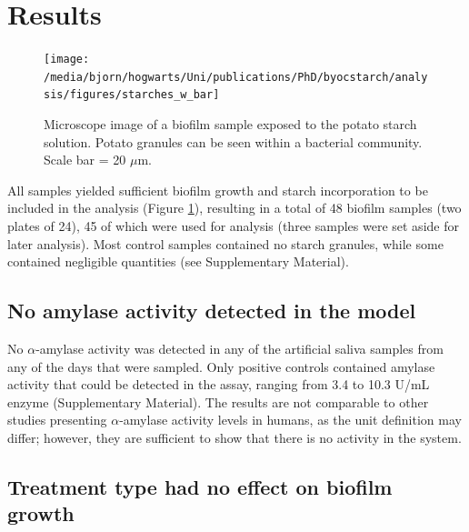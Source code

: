 \documentclass[
]{article}
\begin{document}
\hypertarget{results}{%
\section{Results}\label{results}}

\begin{figure}

{\centering \texttt{[image: /media/bjorn/hogwarts/Uni/publications/PhD/byocstarch/analysis/figures/starches\_w\_bar]} 

}

\caption{Microscope image of a biofilm sample exposed to the potato starch solution. Potato granules can be seen within a bacterial community. Scale bar = 20 $\mu$m.}\label{fig:microscope-fig}
\end{figure}

All samples yielded sufficient biofilm growth and starch incorporation to be
included in the analysis (Figure \ref{fig:microscope-fig}), resulting in a total of 48 biofilm samples (two plates of 24),
45 of which were used for analysis (three samples were set aside for later
analysis).
Most control samples contained no starch granules, while some contained negligible
quantities (see Supplementary Material).

\hypertarget{no-amylase-activity-detected-in-the-model}{%
\subsection{No amylase activity detected in the model}\label{no-amylase-activity-detected-in-the-model}}

No \(\alpha\)-amylase activity was detected in any of the artificial
saliva samples from any of the days that were sampled. Only positive controls
contained amylase activity that could be detected in the assay, ranging from
3.4 to 10.3 U/mL enzyme
(Supplementary Material).
The results are not comparable to other studies presenting \(\alpha\)-amylase activity
levels in humans, as the unit definition may differ;
however, they are sufficient to show that there is no activity in the system.

\hypertarget{treatment-type-had-no-effect-on-biofilm-growth}{%
\subsection{Treatment type had no effect on biofilm growth}\label{treatment-type-had-no-effect-on-biofilm-growth}}
\end{document}
